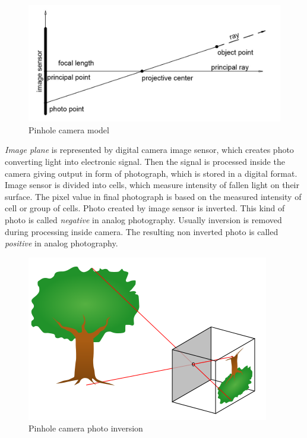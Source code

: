 \documentclass[a4paper,12pt]{article}
\newcommand{\term}[1]{
{\it #1}
}
\begin{document}
\begin{figure}[h]
    \centering
    \includegraphics[scale=0.3]{figures/pinhole_camera.png}
    \caption{Pinhole camera model}
\end{figure}



\term{Image plane} is represented by digital camera image sensor, which  creates photo converting light into electronic signal.
Then the signal is processed inside the camera giving output in form of photograph, which is stored in a digital format. 
Image sensor is divided into cells, which measure intensity of fallen light on their surface. The pixel value in final 
photograph is based on the measured intensity of cell or group of cells. Photo created by image sensor is inverted. This kind 
of photo is called \term{negative} in analog photography.  Usually inversion is removed during processing inside 
camera. The resulting non inverted photo is called \term{positive} in analog photography. 

\begin{figure}[h]
    \centering
    \includegraphics[scale=0.4]{figures/pinhole_camera_inversion.png}
    \caption{Pinhole camera photo inversion \cite{mellish2005pinhole}}
\end{figure}
\end{document}

